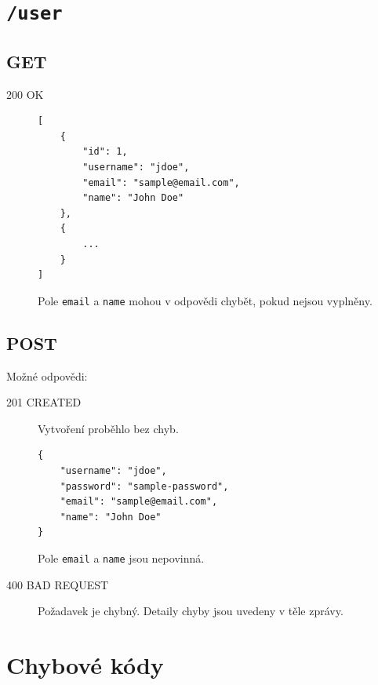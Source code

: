\documentclass[thesis=B,czech]{FITthesis}[2012/06/26]
\begin{document}
	
	\section{\texttt{/user}}
		\subsection{GET}
			\begin{description}
				\item[200 OK] \hfill
					\begin{Verbatim}[obeytabs,tabsize=2]
[
	{
		"id": 1,
		"username": "jdoe",
		"email": "sample@email.com",
		"name": "John Doe"
	},
	{
		...
	}
]
				\end{Verbatim}
				Pole \texttt{email} a \texttt{name} mohou v odpovědi chybět, pokud nejsou vyplněny.
			\end{description}
			
		\subsection{POST}

			Možné odpovědi:
			\begin{description}
				\item[201 CREATED] Vytvoření proběhlo bez chyb. \\
					\begin{Verbatim}[obeytabs,tabsize=2]
{
	"username": "jdoe",
	"password": "sample-password",
	"email": "sample@email.com",
	"name": "John Doe"
}							
					\end{Verbatim}
					Pole \texttt{email} a \texttt{name} jsou nepovinná.\\
				\item[400 BAD REQUEST] Požadavek je chybný. Detaily chyby jsou uvedeny v těle zprávy.
			\end{description}
			
	\section{Chybové kódy}
	\label{appdx:rest-error-codes}
\end{document}
